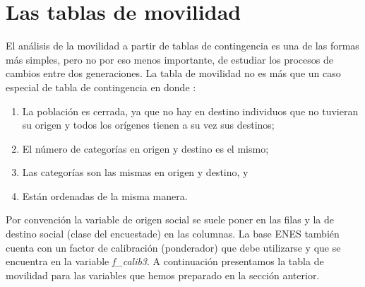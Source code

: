 \documentclass[
]{book}
\newenvironment{Shaded}{\begin{snugshade}}{\end{snugshade}}
\newcommand{\AttributeTok}[1]{\textcolor[rgb]{0.77,0.63,0.00}{#1}}
\newcommand{\FunctionTok}[1]{\textcolor[rgb]{0.00,0.00,0.00}{#1}}
\newcommand{\NormalTok}[1]{#1}
\newcommand{\SpecialCharTok}[1]{\textcolor[rgb]{0.00,0.00,0.00}{#1}}
\newcommand{\StringTok}[1]{\textcolor[rgb]{0.31,0.60,0.02}{#1}}
\providecommand{\tightlist}{%
  \setlength{\itemsep}{0pt}\setlength{\parskip}{0pt}}
\begin{document}
\hypertarget{movilidad2}{%
\section{Las tablas de movilidad}\label{movilidad2}}

El análisis de la movilidad a partir de tablas de contingencia es una de las formas más simples, pero no por eso menos importante, de estudiar los procesos de cambios entre dos generaciones. La tabla de movilidad no es más que un caso especial de tabla de contingencia en donde \citep[pp.~243]{CachonRodriguez1989}:

\begin{enumerate}
\def\labelenumi{\arabic{enumi}.}
\tightlist
\item
  La población es cerrada, ya que no hay en destino individuos que no tuvieran su origen y todos los orígenes tienen a su vez sus destinos;\\
\item
  El número de categorías en origen y destino es el mismo;\\
\item
  Las categorías son las mismas en origen y destino, y\\
\item
  Están ordenadas de la misma manera.
\end{enumerate}

Por convención la variable de origen social se suele poner en las filas y la de destino social (clase del encuestade) en las columnas. La base ENES también cuenta con un factor de calibración (ponderador) que debe utilizarse y que se encuentra en la variable \emph{f\_calib3}. A continuación presentamos la tabla de movilidad para las variables que hemos preparado en la sección anterior.

\begin{Shaded}
\end{Shaded}
\end{document}
